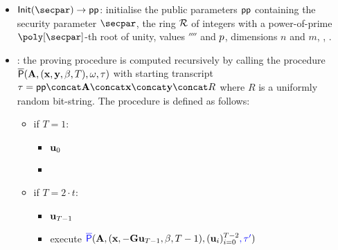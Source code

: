 \begin{itemize}
	\item $\init(\secpar) \to \pp$: initialise the public parameters $\pp$ containing 
		the security parameter $\secpar$, the ring $\Rring$ of integers with a power-of-prime
		$\poly[\secpar]$-th root of unity, values $\qprime$ and $p$, dimensions $n$ and $m$,
		, 
		.
	
	
	
	\item {}: the proving procedure is computed
		recursively by calling the procedure
		$\proveR(\vA,(\vx,\vy,\beta,T), \witness,\transcript)$
		with starting transcript $\transcript = \pp\concat\vA\concat\vx\concat\vy\concat R$
		where $R$ is a uniformly random bit-string.
		The procedure is defined as follows:
		\begin{itemize}
			\item if $T = 1$:
			\begin{itemize}
				\item {}  $\vu[0]$ 
				\item {}
			\end{itemize}
			
			\item if $T = 2 \cdot t$:
			\begin{itemize}
				\item {}  $\vu[T-1]$ 
				\item {} execute
					$\blue{\proveR}(\vA,(\vx,- \vG \vu[T-1],\beta,T-1), (\vu[i])_{i=0}^{T-2}
						\blue{,\transcript^\prime}  )$
			\end{itemize}
			

\end{itemize}
\end{itemize}

